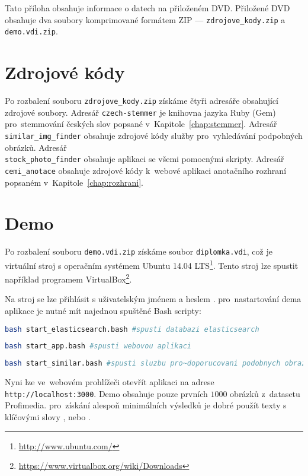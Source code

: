 \label{app:priloha_dvd}

Tato příloha obsahuje informace o datech na přiloženém DVD. Přiložené DVD obsahuje dva soubory komprimované formátem ZIP --- \lstinline{zdrojove_kody.zip} a \lstinline{demo.vdi.zip}.

\section{Zdrojové kódy}

Po rozbalení souboru \lstinline{zdrojove_kody.zip} získáme čtyři adresáře obsahující zdrojové soubory. Adresář \lstinline{czech-stemmer} je knihovna jazyka Ruby (Gem) pro~stemmování českých slov popsané v~Kapitole~\ref{chap:stemmer}. Adresář \lstinline{similar_img_finder} obsahuje zdrojové kódy služby pro~vyhledávání podpobných obrázků. Adresář\\\lstinline{stock_photo_finder} obsahuje aplikaci se všemi pomocnými skripty. Adresář \lstinline{cemi_anotace} obsahuje zdrojové kódy k~webové aplikaci anotačního rozhraní popsaném v~Kapitole~\ref{chap:rozhrani}.

\section{Demo}

Po rozbalení souboru \lstinline{demo.vdi.zip} získáme soubor \lstinline{diplomka.vdi}, což je virtuální stroj s operačním systémem Ubuntu 14.04 LTS\footnote{\url{http://www.ubuntu.com/}}. Tento stroj lze spustit například programem VirtualBox\footnote{\url{https://www.virtualbox.org/wiki/Downloads}}.

Na stroj se lze přihlásit s uživatelským jménem  a heslem . pro~nastartování dema aplikace je nutné mít najednou spuštěné Bash scripty:

\begin{lstlisting}[language=bash]
bash start_elasticsearch.bash #spusti databazi elasticsearch
\end{lstlisting}

\begin{lstlisting}[language=bash]
bash start_app.bash #spusti webovou aplikaci
\end{lstlisting}

\begin{lstlisting}[language=bash]
bash start_similar.bash #spusti sluzbu pro~doporucovani podobnych obrazku
\end{lstlisting}


Nyni lze ve~webovém prohlížeči otevřít aplikaci na adrese \lstinline{http://localhost:3000}. Demo obsahuje pouze prvních $1 000$ obrázků z~datasetu Profimedia. pro~získání alespoň minimálních výsledků je dobré použít texty s klíčovými slovy , nebo .